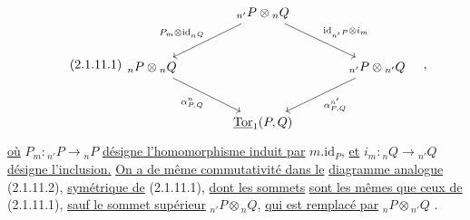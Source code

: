 \begin{equation}\tag{2.1.11.1}
\begin{tikzcd}[column sep=large, row sep=large]
 & {{}_{n'}P \otimes {}_{n}Q} \arrow[ld, "P_m \otimes \mathrm{id}_{{}_{n}Q}"'] \arrow[rd, "\mathrm{id}_{{}_{n'}P} \otimes i_m"] & \\
{{}_{n}P \otimes {}_{n}Q} \arrow[rd, "{\alpha^{n}_{P,Q}}"'] & & {{}_{n'}P \otimes {}_{n'}Q} \arrow[ld, "{\alpha^{n'}_{P,Q}}"] \\
 & {\underline{\mathrm{Tor}}_1(P,Q)} &
\end{tikzcd}\quad ,
\end{equation}
\underline{où} $P_m : {}_{n'}P \longrightarrow {}_{n}P$ \underline{désigne l'homomorphisme induit par} $m.\mathrm{id}_P$, \underline{et} $i_m : {}_{n}Q \longrightarrow {}_{n'}Q$ \underline{désigne l'inclusion.} \underline{On a de même commutativité dans le} \underline{diagramme analogue} (2.1.11.2), \underline{symétrique de} (2.1.11.1), \underline{dont les sommets} \underline{sont les mêmes que ceux de} (2.1.11.1), \underline{sauf le sommet supérieur} ${}_{n'}P \otimes {}_{n}Q$, \underline{qui est remplacé par} ${}_{n}P \otimes {}_{n'}Q$ .


